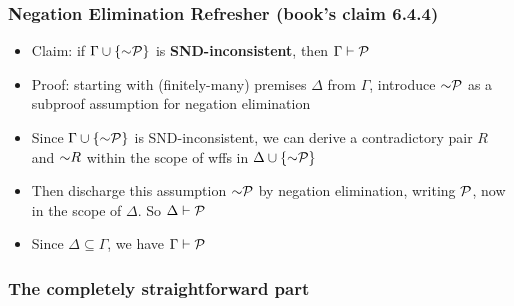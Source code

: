 \begin{frame}
\frametitle{Negation Elimination Refresher (book's claim 6.4.4)}

\begin{itemize}[<+->]

\item Claim: if $\Gamma \cup \{\enot \metav{P}\}$ is \textbf{\textcolor{OGlyallpink}{SND-inconsistent}}, then $\Gamma \vdash \mathcal{P}$

\item Proof: starting with (finitely-many) premises $\Delta$ from $\Gamma$, introduce $\enot \metav{P}$ as a subproof assumption for negation elimination

\item Since $\Gamma \cup \{\enot \metav{P}\}$ is SND-inconsistent, we can derive a contradictory pair $R$ and $\enot R$ within the scope of wffs in $\Delta \cup \{\enot \metav{P}\}$

\item Then discharge this assumption $\enot \metav{P}$ by negation elimination, writing $\mathcal{P}$, now in the scope of $\Delta$. So $\Delta \vdash \mathcal{P}$

\item Since $\Delta \subseteq \Gamma$, we have $\Gamma \vdash \mathcal{P}$




\end{itemize}
\end{frame}

\subsubsection{The completely straightforward part}

